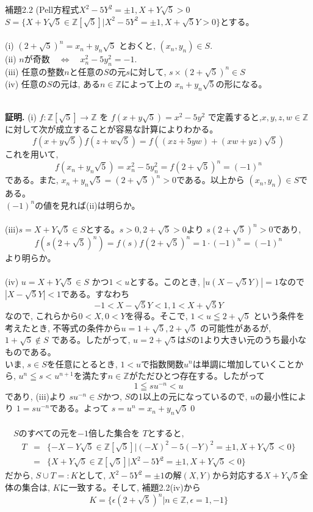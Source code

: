 \documentclass[twocolumn]{jsarticle}
\newcommand{\thm}{\begin{itembox}[l]}
\newcommand{\enthm}{\end{itembox}\\}
\newcommand{\dou}{\Leftrightarrow}  %
\renewcommand{\leq}{\leqq}
\newcommand{\mb}{\mathbb}
\begin{document}
\thm{補題2.2 (Pell方程式$X^2-5Y^2=\pm 1,　X+Y\sqrt{5}>0$}
$S=\{X+Y\sqrt{5}\in\mb{Z}[\sqrt{5}] |  X^2-5Y^2=\pm 1,　X+\sqrt{5}Y>0\}$とする。\\
\\
(i) $(2+\sqrt{5})^n=x_n+y_n\sqrt{5}$ とおくと, $(x_n, y_n)\in S$.\\
(ii) $n$が奇数　$\dou$　$x_n^2-5y_n^2=-1$.\\
(iii) 任意の整数$n$と任意の$S$の元$s$に対して, $s\times(2+\sqrt{5})^n \in S$\\
(iv) 任意の$S$の元は, ある$n\in \mb{Z}$によって上の $x_n+y_n\sqrt{5}$の形になる。\\
\enthm
{\bf 証明.}
(i) $f:\mb{Z}[\sqrt{5}]\to \mb{Z}$ を $f(x+y\sqrt{5})=x^2-5y^2$ で定義すると,$x,y,z,w\in \mb{Z}$に対して次が成立することが容易な計算によりわかる。
\[f(x+y\sqrt{5})f(z+w\sqrt{5})=f((xz+5yw)+(xw+yz)\sqrt{5})\]
これを用いて, 
\[f(x_n+y_n\sqrt{5})=x_n^2-5y_n^2=f(2+\sqrt{5})^n=(-1)^n\]
である。また, $x_n+y_n\sqrt{5}=(2+\sqrt{5})^n>0$である。以上から $(x_n, y_n)\in S$である。\\
$(-1)^n$の値を見れば(ii)は明らか。\\
\\
(iii)$s=X+Y\sqrt{5}\in S$とする。$s>0, 2+\sqrt{5}>0$より $s(2+\sqrt{5})^n>0$であり,
\[f(s(2+\sqrt{5})^n)=f(s)f(2+\sqrt{5})^n=1\cdot(-1)^n=(-1)^n\]
より明らか。\\
\\
(iv) $u=X+Y\sqrt{5}\in S$ かつ$1<u$とする。このとき,  $|u(X-\sqrt{5}Y)|=1$なので $|X-\sqrt{5}Y|<1$である。すなわち
\[-1<X-\sqrt{5}Y<1,　　1<X+\sqrt{5}Y\]
なので, これらから$0<X,  0<Y$を得る。そこで, $1<u\leq 2+\sqrt{5}$ という条件を考えたとき, 不等式の条件から$u=1+\sqrt{5}, 2+\sqrt{5}$ の可能性があるが, $1+\sqrt{5}\notin S$ である。したがって, $u=2+\sqrt{5}$は$S$の1より大きい元のうち最小なものである。\\
いま, $s\in S$を任意にとるとき, $1<u$で指数関数$u^n$は単調に増加していくことから, $u^n\leq s<u^{n+1}$を満たす$n\in \mb{Z}$がただひとつ存在する。したがって
\[1\leq su^{-n}<u\]
であり, (iii)より $su^{-n}\in S$かつ, $S$の1以上の元になっているので, $u$の最小性により $1=su^{-n}$である。よって $s=u^{n}=x_n+y_n\sqrt{5}$\qed
\\
\\



　$S$のすべての元を$-1$倍した集合を $T$とすると,
\begin{eqnarray*}
T&=&\{-X-Y\sqrt{5}\in \mb{Z}[\sqrt{5}]| (-X)^2-5(-Y)^2=\pm 1, X+Y\sqrt{5}<0\}\\
 &=&\{ X+Y\sqrt{5}\in \mb{Z}[\sqrt{5}]| X^2-5Y^2=\pm 1, X+Y\sqrt{5}<0 \}
\end{eqnarray*}
だから, $S\cup T=:K$として, $X^2-5Y^2=\pm 1$の解$(X,Y)$から対応する$X+Y\sqrt{5}$全体の集合は, $K$に一致する。そして, 補題2.2(iv)から
\[K=\{\epsilon(2+\sqrt{5})^n | n\in \mb{Z},　\epsilon =1, -1\}\]
\end{document}
